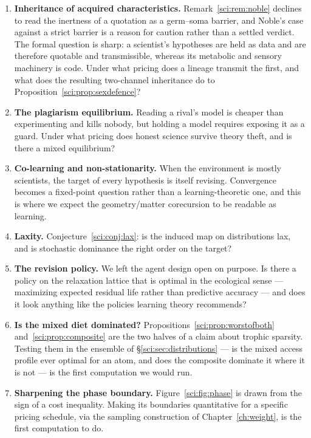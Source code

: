 \begin{enumerate}
\item \label{sci:op:noble} \textbf{Inheritance of acquired characteristics.} Remark~\ref{sci:rem:noble}
declines to read the inertness of a quotation as a germ--soma barrier, and Noble's case against a
strict barrier \cite{Noble} is a reason for caution rather than a settled verdict. The formal question
is sharp: a scientist's hypotheses are held as data and are therefore quotable and transmissible,
whereas its metabolic and sensory machinery is code. Under what pricing does a lineage transmit the
first, and what does the resulting two-channel inheritance do to
Proposition~\ref{sci:prop:sexdefence}?

\item \textbf{The plagiarism equilibrium.} Reading a rival's model is cheaper than experimenting and
kills nobody, but holding a model requires exposing it as a guard. Under what pricing does honest
science survive theory theft, and is there a mixed equilibrium?

\item \textbf{Co-learning and non-stationarity.} When the environment is mostly scientists, the target
of every hypothesis is itself revising. Convergence becomes a fixed-point question rather than a
learning-theoretic one, and this is where we expect the geometry/matter corecursion to be readable as
learning.

\item \textbf{Laxity.} Conjecture~\ref{sci:conj:lax}: is the induced map on distributions lax, and is
stochastic dominance the right order on the target?

\item \textbf{The revision policy.} We left the agent design open on purpose. Is there a policy on the
relaxation lattice that is optimal in the ecological sense --- maximizing expected residual life
rather than predictive accuracy --- and does it look anything like the policies learning theory
recommends?

\item \textbf{Is the mixed diet dominated?} Propositions~\ref{sci:prop:worstofboth}
and~\ref{sci:prop:composite} are the two halves of a claim about trophic sparsity. Testing them in the
ensemble of \S\ref{sci:sec:distributions} --- is the mixed access profile ever optimal for an atom, and
does the composite dominate it where it is not --- is the first computation we would run.

\item \textbf{Sharpening the phase boundary.} Figure~\ref{sci:fig:phase} is drawn from the sign of a cost
inequality. Making its boundaries quantitative for a specific pricing schedule, via the sampling
construction of Chapter~\ref{ch:weight}, is the first computation to do.
\end{enumerate}


